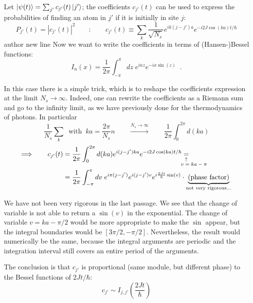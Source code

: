 \noindent Let $\ket{\psi(t)} = \sum_{j'} c_{j'}(t)\ket{j'}$; the coefficients $c_{j'}(t)$ can be used to express the probabilities of finding an atom in $j'$ if it is initially in site $j$:
\begin{equation*}
    P_{j'}(t) = |c_{j'}(t)|^2
    \qquad:\qquad
    c_{j'}(t) \equiv \sum_k \frac{1}{\sqrt{N_s}} e^{ik(j-j')a} e^{-i2J\cos(ka)t/\hbar}
\end{equation*}
author new line
Now we want to write the coefficients in terms of (Hansen-)Bessel functions:
\begin{equation*}
    I_n (x) = \frac{1}{2\pi} \int_{-\pi}^{\pi} dz \; e^{inz} e^{-ix\sin(z)} \;\;.
\end{equation*}

\noindent In this case there is a simple trick, which is to reshape the coefficients expression at the limit $N_s\rightarrow\infty$. Indeed, one can rewrite the coefficients as a Riemann sum and go to the infinity limit, as we have previously done for the thermodynamics of photons. In particular
\begin{equation*}
    \frac{1}{N_s}\sum_k \;\;\text{with}\;\; ka=\frac{2\pi}{N_s}n
    \qquad\xrightarrow{N_s\rightarrow\infty}\qquad
    \frac{1}{2\pi}\int_0^{2\pi} d(ka) 
\end{equation*}
\begin{align*}
    \Longrightarrow\qquad
    c_{j'}(t) &=\frac{1}{2\pi} \int_{0}^{2\pi} d(ka) e^{i(j-j')ka} e^{-i2J\cos(ka)t/\hbar} \equalexpl{$v=ka-\pi$} \\
    &= \frac{1}{2\pi} \int_{-\pi}^{\pi} dv\; 
        e^{i\pi(j-j')} e^{i(j-j')v} e^{i\frac{2Jt}{\hbar}\sin(v)}
        \cdot \underbrace{\text{(phase factor)}}_{\text{not very rigorous...}}
\end{align*}

We have not been very rigorous in the last passage. We see that the change of variable is not able to return a $\sin(v)$ in the exponential. The change of variable $v=ka-\pi/2$ would be more appropriate to make the $\sin$ appear, but the integral boundaries would be $[3\pi/2,-\pi/2]$. Nevertheless, the result would numerically be the same, because the integral arguments are periodic and the integration interval still covers an entire period of the arguments.

The conclusion is that $c_{j'}$ is proportional (same module, but different phase) to the Bessel functions of $2Jt/\hbar$:
\begin{equation*}
    c_{j'} \sim I_{j,j'} \left( \frac{2Jt}{\hbar} \right)
\end{equation*}

